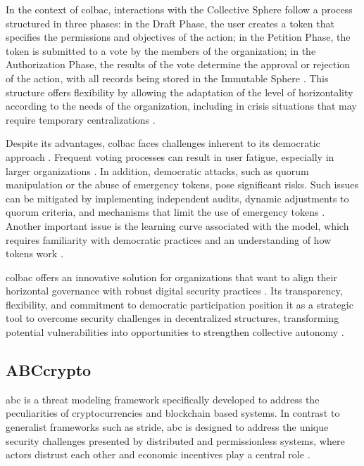 In the context of \gls{colbac}, interactions with the Collective Sphere follow a
process structured in three phases: in the Draft Phase, the user creates a token
that specifies the permissions and objectives of the action; in the Petition
Phase, the token is submitted to a vote by the members of the organization;
in the Authorization Phase, the results of the vote determine the
approval or rejection of the action, with all records being stored in the
Immutable Sphere \cite{Colbac}. This structure offers flexibility by allowing
the adaptation of the level of horizontality according to the needs of the
organization, including in crisis situations that may require temporary
centralizations \cite{Colbac}.

Despite its advantages, \gls{colbac} faces challenges inherent to its democratic
approach \cite{Colbac}. Frequent voting processes can result in user fatigue,
especially in larger organizations \cite{Colbac, EverydayRevolutions}. In
addition, democratic attacks, such as quorum manipulation or the abuse of
emergency tokens, pose significant risks. Such issues can be mitigated by
implementing independent audits, dynamic adjustments to quorum criteria, and
mechanisms that limit the use of emergency tokens \cite{Colbac}. Another
important issue is the learning curve associated with the model, which requires
familiarity with democratic practices and an understanding of how tokens work
\cite{Colbac}.

\gls{colbac} offers an innovative solution for organizations that want to align
their horizontal governance with robust digital security practices
\cite{Colbac}. Its transparency, flexibility, and commitment to democratic
participation position it as a strategic tool to overcome security challenges in
decentralized structures, transforming potential vulnerabilities into
opportunities to strengthen collective autonomy \cite{Colbac,
EverydayRevolutions}.

\subsection{ABCcrypto}
\label{subsec:abccrypto}

\gls{abc} is a threat modeling framework specifically developed to address the
peculiarities of cryptocurrencies and blockchain based systems. In contrast to
generalist frameworks such as \gls{stride}, \gls{abc} is designed to address the
unique security challenges presented by distributed and permissionless systems,
where actors distrust each other and economic incentives play a central role
\cite{AbcCrypto}.

